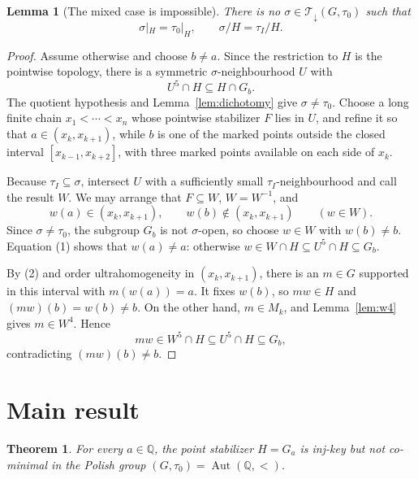 \documentclass[11pt]{article}
\newtheorem{theorem}{Theorem}
\newtheorem{lemma}{Lemma}
\newcommand{\Aut}{\operatorname{Aut}}
\newcommand{\Q}{\mathbb Q}
\newcommand{\Tdown}{\mathcal T_{\downarrow}}
\begin{document}
\begin{lemma}[The mixed case is impossible]\label{lem:mixed}
There is no $\sigma\in\Tdown(G,\tau_0)$ such that
\[
 \sigma|_H=\tau_0|_H,
 \qquad \sigma/H=\tau_I/H.
\]
\end{lemma}

\begin{proof}
Assume otherwise and choose $b\ne a$.  Since the restriction to $H$ is the
pointwise topology, there is a symmetric $\sigma$-neighbourhood $U$ with
\[
 U^5\cap H\subseteq H\cap G_b. \tag{1}
\]
The quotient hypothesis and Lemma~\ref{lem:dichotomy} give
$\sigma\ne\tau_0$.  Choose a long finite chain
$x_1<\cdots<x_n$ whose pointwise stabilizer $F$ lies in $U$, and refine it
so that $a\in(x_k,x_{k+1})$, while $b$ is one of the marked points outside
the closed interval $[x_{k-1},x_{k+2}]$, with three marked points available
on each side of $x_k$.

Because $\tau_I\subseteq\sigma$, intersect $U$ with a sufficiently small
$\tau_I$-neighbourhood and call the result $W$.  We may arrange that
$F\subseteq W$, $W=W^{-1}$, and
\[
 w(a)\in(x_k,x_{k+1}),\qquad
 w(b)\notin(x_k,x_{k+1})\qquad(w\in W). \tag{2}
\]
Since $\sigma\ne\tau_0$, the subgroup $G_b$ is not $\sigma$-open, so choose
$w\in W$ with $w(b)\ne b$.  Equation (1) shows that $w(a)\ne a$: otherwise
$w\in W\cap H\subseteq U^5\cap H\subseteq G_b$.

By (2) and order ultrahomogeneity in $(x_k,x_{k+1})$, there is an
$m\in G$ supported in this interval with $m(w(a))=a$.  It fixes $w(b)$, so
$mw\in H$ and $(mw)(b)=w(b)\ne b$.  On the other hand,
$m\in M_k$, and
Lemma~\ref{lem:w4} gives $m\in W^4$.  Hence
\[
 mw\in W^5\cap H\subseteq U^5\cap H\subseteq G_b,
\]
contradicting $(mw)(b)\ne b$.
\end{proof}

\section*{Main result}

\begin{theorem}\label{thm:main}
For every $a\in\Q$, the point stabilizer $H=G_a$ is inj-key but not
co-minimal in the Polish group $(G,\tau_0)=\Aut(\Q,<)$.
\end{theorem}
\end{document}
